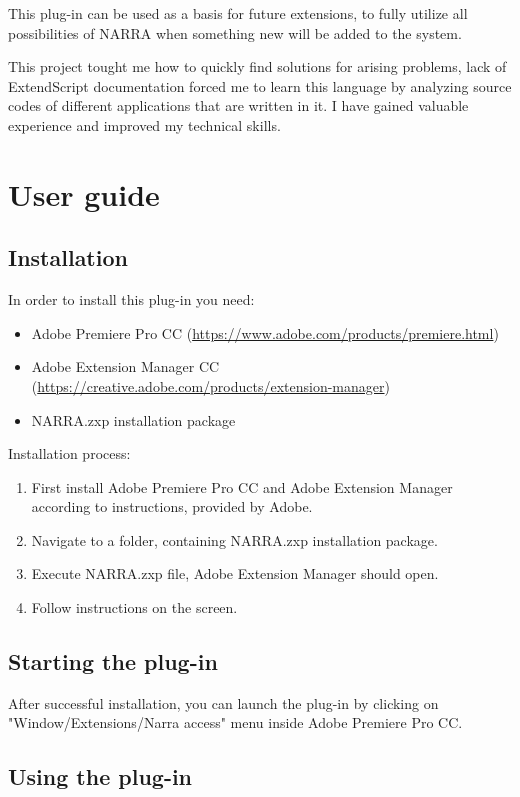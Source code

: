 \documentclass[thesis=B,english]{FITthesis}[2012/10/20]
\begin{document}
This plug-in can be used as a basis for future extensions, to fully utilize all possibilities of NARRA when something new will be added to the system. 

This project tought me how to quickly find solutions for arising problems, lack of ExtendScript documentation forced me to learn this language by analyzing source codes of different applications that are written in it. I have gained valuable experience and improved my technical skills.




\appendix

\chapter{User guide}
\section{Installation}
In order to install this plug-in you need:
	\begin{itemize}
		\item Adobe Premiere Pro CC (\url{https://www.adobe.com/products/premiere.html})
		\item Adobe Extension Manager CC (\url{https://creative.adobe.com/products/extension-manager})
		\item NARRA.zxp installation package
	\end{itemize}
Installation process:
	\begin{enumerate}
		\item First install Adobe Premiere Pro CC and Adobe Extension Manager according to instructions, provided by Adobe.
		\item Navigate to a folder, containing NARRA.zxp installation package.
		\item Execute NARRA.zxp file, Adobe Extension Manager should open.
		\item Follow instructions on the screen.
	\end{enumerate}
\section{Starting the plug-in}
After successful installation, you can launch the plug-in by clicking on "Window/Extensions/Narra access" menu inside Adobe Premiere Pro CC.

\section{Using the plug-in}
\end{document}
